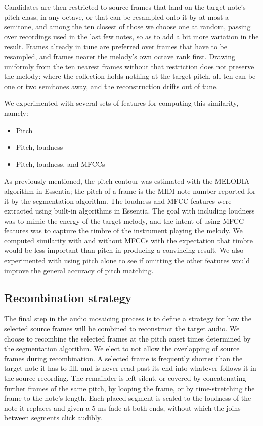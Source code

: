 \documentclass{article}
\begin{document}
Candidates are then restricted to source frames that land on the target note's pitch class, in any octave, or that can be resampled onto it by at most a semitone, and among the ten closest of those we choose one at random, passing over recordings used in the last few notes, so as to add a bit more variation in the result.
Frames already in tune are preferred over frames that have to be resampled, and frames nearer the melody's own octave rank first.
Drawing uniformly from the ten nearest frames without that restriction does not preserve the melody: where the collection holds nothing at the target pitch, all ten can be one or two semitones away, and the reconstruction drifts out of tune.

We experimented with several sets of features for computing this similarity, namely:

\begin{itemize}
  \item Pitch
  \item Pitch, loudness
  \item Pitch, loudness, and MFCCs
\end{itemize}

As previously mentioned, the pitch contour was estimated with the MELODIA algorithm in Essentia; the pitch of a frame is the MIDI note number reported for it by the segmentation algorithm.
The loudness and MFCC features were extracted using built-in algorithms in Essentia.
The goal with including loudness was to mimic the energy of the target melody, and the intent of using MFCC features was to capture the timbre of the instrument playing the melody.
We computed similarity with and without MFCCs with the expectation that timbre would be less important than pitch in producing a convincing result.
We also experimented with using pitch alone to see if omitting the other features would improve the general accuracy of pitch matching.


\subsection{Recombination strategy}

The final step in the audio mosaicing process is to define a strategy for how the selected source frames will be combined to reconstruct the target audio. We choose to recombine the selected frames at the pitch onset times determined by the segmentation algorithm. We elect to not allow the overlapping of source frames during recombination.
A selected frame is frequently shorter than the target note it has to fill, and is never read past its end into whatever follows it in the source recording.
The remainder is left silent, or covered by concatenating further frames of the same pitch, by looping the frame, or by time-stretching the frame to the note's length.
Each placed segment is scaled to the loudness of the note it replaces and given a 5 ms fade at both ends, without which the joins between segments click audibly.
\end{document}
